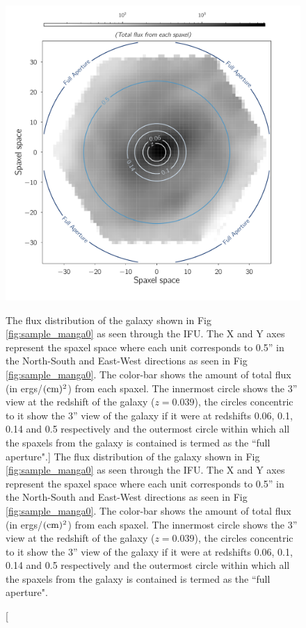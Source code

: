 \begin{figure}
\includegraphics[width=\textwidth]{figures/gal_aperture_redshifts.pdf}
\caption[The flux distribution of the galaxy shown in Fig \ref{fig:sample_manga0}
as seen through the IFU. The X and Y axes represent the spaxel space 
where each unit corresponds to 0.5'' in the North-South and East-West 
directions as seen in Fig \ref{fig:sample_manga0}. The color-bar shows the 
amount of total flux (in ergs/$({\rm cm})^{2}$) from each spaxel. The innermost circle 
shows the 3'' view at the redshift of the galaxy ($z = 0.039$), the circles 
concentric to it show the 3'' view of the galaxy if it were at redshifts
0.06, 0.1, 0.14 and 0.5 respectively and the outermost circle within which 
all the spaxels from the galaxy is contained is termed as the ``full aperture".]
{The flux distribution of the galaxy shown in Fig \ref{fig:sample_manga0}
as seen through the IFU. The X and Y axes represent the spaxel space 
where each unit corresponds to 0.5'' in the North-South and East-West 
directions as seen in Fig \ref{fig:sample_manga0}. The color-bar shows the 
amount of total flux (in ergs/$({\rm cm})^{2}$) from each spaxel. The innermost circle 
shows the 3'' view at the redshift of the galaxy ($z = 0.039$), the circles 
concentric to it show the 3'' view of the galaxy if it were at redshifts
0.06, 0.1, 0.14 and 0.5 respectively and the outermost circle within which 
all the spaxels from the galaxy is contained is termed as the ``full aperture".
\label{fig:sample_manga}}
\end{figure}

